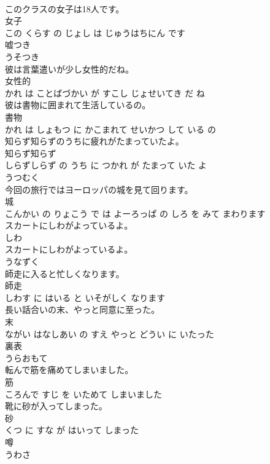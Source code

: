 \documentclass[8pt]{extreport}
\begin{document}
\begin{CJK}{UTF8}{min}
\\	このクラスの女子は18人です。	
\\	女子 
\\	この くらす の じょし は じゅうはちにん です			
\\	嘘つき	
\\	うそつき			
\\	彼は言葉遣いが少し女性的だね。	
\\	女性的 
\\	かれ は ことばづかい が すこし じょせいてき だ ね			
\\	彼は書物に囲まれて生活しているの。	
\\	書物 
\\	かれ は しょもつ に かこまれて せいかつ して いる の			
\\	知らず知らずのうちに疲れがたまっていたよ。	
\\	知らず知らず 
\\	しらずしらず の うち に つかれ が たまって いた よ			
\\	うつむく	
\\	今回の旅行ではヨーロッパの城を見て回ります。	
\\	城 
\\	こんかい の りょこう で は よーろっぱ の しろ を みて まわります			
\\	スカートにしわがよっているよ。	
\\	しわ 
\\	スカートにしわがよっているよ。			
\\	うなずく	
\\	師走に入ると忙しくなります。	
\\	師走 
\\	しわす に はいる と いそがしく なります			
\\	長い話合いの末、やっと同意に至った。	
\\	末 
\\	ながい はなしあい の すえ やっと どうい に いたった			
\\	裏表	
\\	うらおもて			
\\	転んで筋を痛めてしまいました。	
\\	筋 
\\	ころんで すじ を いためて しまいました			
\\	靴に砂が入ってしまった。	
\\	砂 
\\	くつ に すな が はいって しまった			
\\	噂	
\\	うわさ			

\end{CJK}
\end{document}
